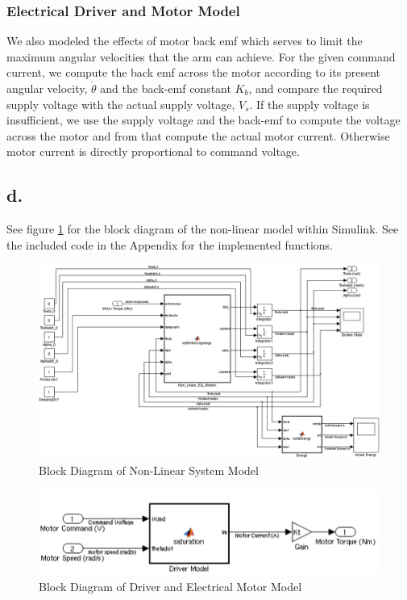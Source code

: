 \documentclass{article}
\theoremstyle{plain}
\theoremstyle{definition}
\theoremstyle{remark}
\begin{document}
\subsubsection*{Electrical Driver and Motor Model}

We also modeled the effects of motor back emf which serves to limit the maximum angular velocities that the arm can achieve. For the given command current, we compute the back emf across the motor according to its present angular velocity, $\dot{\theta}$ and the back-emf constant $K_b$, and compare the required supply voltage with the actual supply voltage, $V_{s}$.  If the supply voltage is insufficient, we use the supply voltage and the back-emf to compute the voltage across the motor and from that compute the actual motor current.  Otherwise motor current is directly proportional to command voltage. 

\subsection*{d.}
See figure \ref{NonLinearBlock} for the block diagram of the non-linear model within Simulink.  See the included code in the Appendix for the implemented functions. \\

\begin{figure}
\begin{center}
\includegraphics[width = 15cm]{NonLinearModelPic.png}
\end{center}
\caption{Block Diagram of Non-Linear System Model}
\label{NonLinearBlock}
\end{figure}

\begin{figure}
\begin{center}
\includegraphics[width = 12cm]{DriverandMotorModel.png}
\end{center}
\caption{Block Diagram of Driver and Electrical Motor Model}
\label{DriverNonLinearBlock}
\end{figure}
\end{document}
